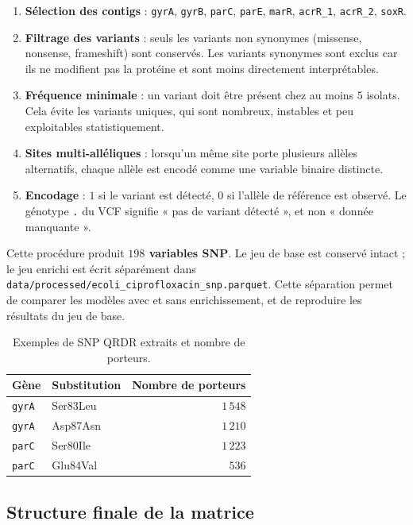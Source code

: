 \documentclass[11pt,a4paper]{article}
\begin{document}
\begin{enumerate}[leftmargin=1.4em]
    \item \textbf{Sélection des contigs} : \texttt{gyrA}, \texttt{gyrB}, \texttt{parC}, \texttt{parE}, \texttt{marR}, \texttt{acrR\_1}, \texttt{acrR\_2}, \texttt{soxR}.
    \item \textbf{Filtrage des variants} : seuls les variants non synonymes (missense, nonsense, frameshift) sont conservés. Les variants synonymes sont exclus car ils ne modifient pas la protéine et sont moins directement interprétables.
    \item \textbf{Fréquence minimale} : un variant doit être présent chez au moins $5$ isolats. Cela évite les variants uniques, qui sont nombreux, instables et peu exploitables statistiquement.
    \item \textbf{Sites multi-alléliques} : lorsqu'un même site porte plusieurs allèles alternatifs, chaque allèle est encodé comme une variable binaire distincte.
    \item \textbf{Encodage} : $1$ si le variant est détecté, $0$ si l'allèle de référence est observé. Le génotype \texttt{.} du VCF signifie « pas de variant détecté », et non « donnée manquante ».
\end{enumerate}

Cette procédure produit \textbf{$198$ variables SNP}. Le jeu de base est conservé intact ; le jeu enrichi est écrit séparément dans \texttt{data/processed/ecoli\_ciprofloxacin\_snp.parquet}. Cette séparation permet de comparer les modèles avec et sans enrichissement, et de reproduire les résultats du jeu de base.

\begin{table}[H]
\centering
\caption{Exemples de SNP QRDR extraits et nombre de porteurs.}
\label{tab:snp_examples}
\begin{tabular}{llr}
\toprule
\textbf{Gène} & \textbf{Substitution} & \textbf{Nombre de porteurs} \\
\midrule
\texttt{gyrA} & Ser83Leu & $1\,548$ \\
\texttt{gyrA} & Asp87Asn & $1\,210$ \\
\texttt{parC} & Ser80Ile & $1\,223$ \\
\texttt{parC} & Glu84Val & $536$ \\
\bottomrule
\end{tabular}
\end{table}

\subsection{Structure finale de la matrice}
\end{document}
